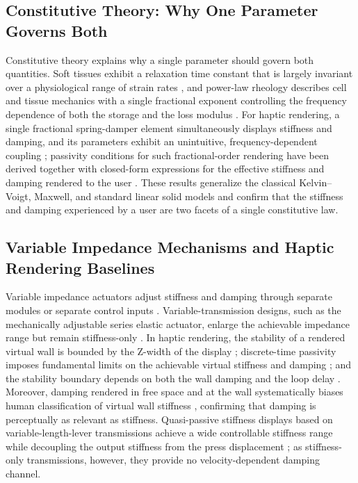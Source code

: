 ﻿\documentclass[conference]{IEEEtran}
\begin{document}
\subsection{Constitutive Theory: Why One Parameter Governs Both}
Constitutive theory explains why a single parameter should govern both
quantities. Soft tissues exhibit a relaxation time constant that is largely
invariant over a physiological range of strain rates
\cite{fun1980biomechanics}, and power-law rheology describes cell and tissue
mechanics with a single fractional exponent controlling the frequency
dependence of both the storage and the loss modulus
\cite{bonfanti2020fractional}. For haptic rendering, a single fractional
spring-damper element simultaneously displays stiffness and damping, and its
parameters exhibit an unintuitive, frequency-dependent coupling
\cite{tolasa2025haptic}; passivity conditions for such fractional-order
rendering have been derived together with closed-form expressions for the
effective stiffness and damping rendered to the user
\cite{gemalmaz2026haptic}. These results generalize the classical
Kelvin--Voigt, Maxwell, and standard linear solid models and confirm that
the stiffness and damping experienced by a user are two facets of a single
constitutive law.

\subsection{Variable Impedance Mechanisms and Haptic Rendering Baselines}
Variable impedance actuators adjust stiffness and damping through separate
modules or separate control inputs \cite{vanderborght2013variable}.
Variable-transmission designs, such as the mechanically adjustable series
elastic actuator, enlarge the achievable impedance range but remain
stiffness-only \cite{mehling2007increasing}. In haptic rendering, the
stability of a rendered virtual wall is bounded by the Z-width of the
display \cite{colgate1994factors}; discrete-time passivity imposes
fundamental limits on the achievable virtual stiffness and damping
\cite{colgate1997passivity}; and the stability boundary depends on both the
wall damping and the loop delay \cite{hulin2006stability,hulin2009stability}.
Moreover, damping rendered in free space and at the wall systematically
biases human classification of virtual wall stiffness
\cite{treadway2024effects}, confirming that damping is perceptually as
relevant as stiffness. Quasi-passive stiffness displays based on
variable-length-lever transmissions achieve a wide controllable stiffness
range while decoupling the output stiffness from the press displacement
\cite{shi2025quasipassive}; as stiffness-only transmissions, however, they
provide no velocity-dependent damping channel.
\end{document}
